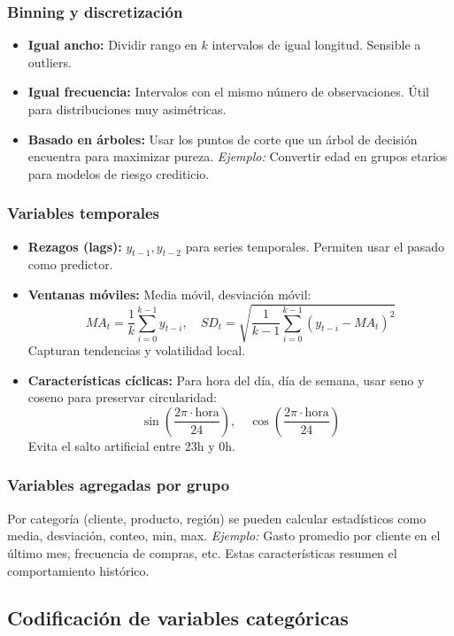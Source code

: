 \documentclass[12pt,a4paper,openany,oneside]{book}
\begin{document}
\subsubsection{Binning y discretización}
\begin{itemize}
    \item \textbf{Igual ancho:} Dividir rango en $k$ intervalos de igual longitud. Sensible a outliers.
    \item \textbf{Igual frecuencia:} Intervalos con el mismo número de observaciones. Útil para distribuciones muy asimétricas.
    \item \textbf{Basado en árboles:} Usar los puntos de corte que un árbol de decisión encuentra para maximizar pureza. \textit{Ejemplo:} Convertir edad en grupos etarios para modelos de riesgo crediticio.
\end{itemize}

\subsubsection{Variables temporales}
\begin{itemize}
    \item \textbf{Rezagos (lags):} $y_{t-1}, y_{t-2}$ para series temporales. Permiten usar el pasado como predictor.
    \item \textbf{Ventanas móviles:} Media móvil, desviación móvil:
    \[
    MA_t = \frac{1}{k}\sum_{i=0}^{k-1} y_{t-i},\quad SD_t = \sqrt{\frac{1}{k-1}\sum_{i=0}^{k-1} (y_{t-i} - MA_t)^2}
    \]
    Capturan tendencias y volatilidad local.
    \item \textbf{Características cíclicas:} Para hora del día, día de semana, usar seno y coseno para preservar circularidad:
    \[
    \sin\left(\frac{2\pi \cdot \text{hora}}{24}\right),\quad \cos\left(\frac{2\pi \cdot \text{hora}}{24}\right)
    \]
    Evita el salto artificial entre 23h y 0h.
\end{itemize}

\subsubsection{Variables agregadas por grupo}
Por categoría (cliente, producto, región) se pueden calcular estadísticos como media, desviación, conteo, min, max. \textit{Ejemplo:} Gasto promedio por cliente en el último mes, frecuencia de compras, etc. Estas características resumen el comportamiento histórico.

\subsection{Codificación de variables categóricas}
\end{document}
